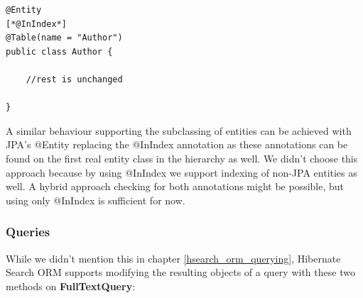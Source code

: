 \lstset{language=java}
\begin{lstlisting}[frame=htrbl, caption={Author.java with @InIndex}, label={lst:author.java_2}]
@Entity
[*@InIndex*]
@Table(name = "Author")
public class Author {
	
	//rest is unchanged
	
}
\end{lstlisting}
\noindent
A similar behaviour supporting the subclassing of entities can be achieved with JPA's @Entity  replacing the @InIndex annotation as these annotations can be found on the first real entity class in the hierarchy as well. We didn't choose this approach because by using @InIndex we support indexing of non-JPA entities as well. A hybrid approach checking for both annotations might be possible, but using only @InIndex is sufficient for now.

\pagebreak

\subsubsection{Queries}
While we didn't mention this in chapter \ref{hsearch_orm_querying}, Hibernate Search ORM supports modifying the resulting objects of a query with these two methods on \textbf{FullTextQuery}:


